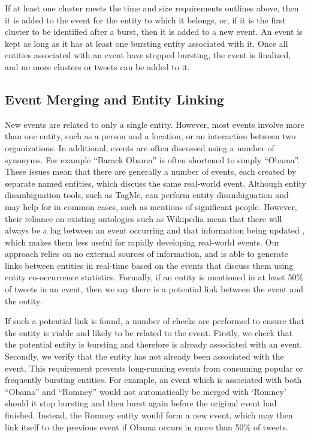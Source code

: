 If at least one cluster meets the time and size requirements outlines above, then it is added to the event for the entity to which it belongs, or, if it is the first cluster to be identified after a burst, then it is added to a new event.
An event is kept as long as it has at least one bursting entity associated with it.
Once all entities associated with an event have stopped bursting, the event is finalized, and no more clusters or tweets can be added to it.

\subsection{Event Merging and Entity Linking}
\label{detection:sec:entityLinking}
New events are related to only a single entity.
However, most events involve more than one entity, such as a person and a location, or an interaction between two organizations.
In additional, events are often discussed using a number of synonyms.
For example ``Barack Obama'' is often shortened to simply ``Obama''.
These issues mean that there are generally a number of events, each created by separate named entities, which discuss the same real-world event.
Although entity disambiguation tools, such as TagMe, can perform entity disambiguation and may help for in common cases, such as mentions of significant people.
However, their reliance on existing ontologies such as Wikipedia mean that there will always be a lag between an event occurring and that information being updated \citep{WRN2012:osbornebieber}, which makes them less useful for rapidly developing real-world events.
Our approach relies on no external sources of information, and is able to generate links between entities in real-time based on the events that discuss them using entity co-occurrence statistics.
Formally, if an entity is mentioned in at least 50\% of tweets in an event, then we say there is a potential link between the event and the entity.

If such a potential link is found, a number of checks are performed to ensure that the entity is viable and likely to be related to the event. Firstly, we check that the potential entity is bursting and therefore is already associated with an event. Secondly, we verify that the entity has not already been associated with the event. This requirement prevents long-running events from consuming popular or frequently bursting entities. For example, an event which is associated with both ``Obama'' and ``Romney'' would not automatically be merged with `Romney' should it stop bursting and then burst again before the original event had finished. Instead, the Romney entity would form a new event, which may then link itself to the previous event if Obama occurs in more than 50\% of tweets.

